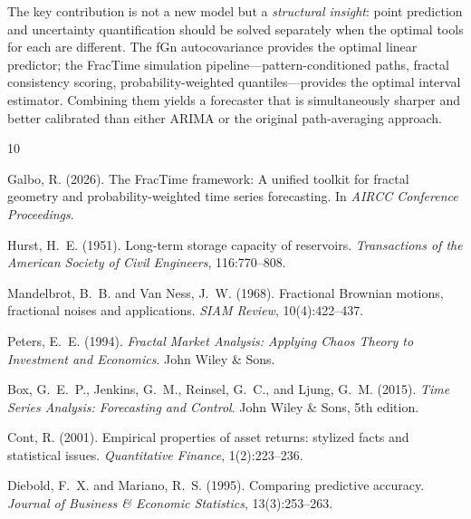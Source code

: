 \documentclass[12pt,a4paper]{article}
\begin{document}
The key contribution is not a new model but a \emph{structural insight}:
point prediction and uncertainty quantification should be solved separately
when the optimal tools for each are different.  The fGn autocovariance
provides the optimal linear predictor; the FracTime simulation pipeline---pattern-conditioned
paths, fractal consistency scoring, probability-weighted quantiles---provides
the optimal interval estimator.  Combining them yields a forecaster that is
simultaneously sharper and better calibrated than either ARIMA or the
original path-averaging approach.



\begin{thebibliography}{10}

Galbo, R. (2026).
\newblock The {FracTime} framework: A unified toolkit for fractal geometry and
  probability-weighted time series forecasting.
\newblock In \emph{AIRCC Conference Proceedings}.

Hurst, H.~E. (1951).
\newblock Long-term storage capacity of reservoirs.
\newblock \emph{Transactions of the American Society of Civil Engineers},
  116:770--808.

Mandelbrot, B.~B. and {Van Ness}, J.~W. (1968).
\newblock Fractional {B}rownian motions, fractional noises and applications.
\newblock \emph{SIAM Review}, 10(4):422--437.

Peters, E.~E. (1994).
\newblock \emph{Fractal Market Analysis: Applying Chaos Theory to Investment
  and Economics}.
\newblock John Wiley \& Sons.

Box, G.~E.~P., Jenkins, G.~M., Reinsel, G.~C., and Ljung, G.~M. (2015).
\newblock \emph{Time Series Analysis: Forecasting and Control}.
\newblock John Wiley \& Sons, 5th edition.

Cont, R. (2001).
\newblock Empirical properties of asset returns: stylized facts and statistical
  issues.
\newblock \emph{Quantitative Finance}, 1(2):223--236.

Diebold, F.~X. and Mariano, R.~S. (1995).
\newblock Comparing predictive accuracy.
\newblock \emph{Journal of Business \& Economic Statistics}, 13(3):253--263.


\end{thebibliography}
\end{document}

